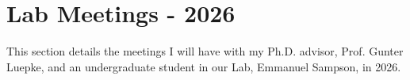 \chapter{Lab Meetings - 2026}
\label{chap: Lab Meetings}


This section details the meetings I will have with my Ph.D. advisor, Prof. Gunter Luepke, and an undergraduate student in our Lab, Emmanuel Sampson, in 2026.

% 
% 

% 
% 

